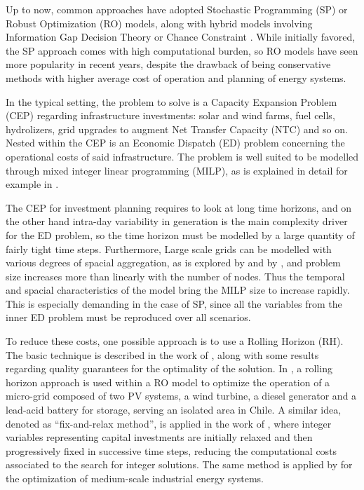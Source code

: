 \documentclass[smallextended,natbib]{svjour3}       %
\numberwithin{theorem}{section}
\begin{document}
Up to now, common approaches have adopted Stochastic Programming (SP) or Robust Optimization (RO) models, along with hybrid
 models involving Information Gap Decision Theory or Chance Constraint \citep{review_math_opt}. 
While initially favored, the SP approach comes with high computational burden, so RO models have seen more popularity 
in recent years, despite the drawback of being conservative methods with higher average cost of operation and planning of energy systems.

In the typical setting, the problem to solve is a Capacity Expansion Problem (CEP) regarding infrastructure investments:
 solar and wind farms, fuel cells, hydrolizers, grid upgrades to augment Net Transfer Capacity (NTC) and so on. 
Nested within the CEP is an Economic Dispatch (ED) problem concerning the operational costs of said infrastructure. 
The problem is well suited to be modelled through mixed integer linear programming (MILP), as is explained in detail for example in 
\citet{INTRO_isolated_MIP}.%

The CEP for investment planning requires to look at long time horizons, and on the other hand intra-day variability in generation is the main complexity driver for the ED problem, so the time horizon must be modelled by a large quantity of fairly tight time steps. 
Furthermore, Large scale grids can be modelled with various degrees of spacial aggregation, as is explored by \citet{Horsch} and by \citet{BIENER2020106349}, and problem size increases more than linearly with the number of nodes.
Thus the temporal and spacial characteristics of the model bring the MILP size to increase rapidly. 
This is especially demanding in the case of SP, since all the variables from the inner ED problem must be reproduced over all scenarios.

To reduce these costs, one possible approach is to use a Rolling Horizon (RH). 
The basic technique is described in the work of \citet{INTRO_Glomb}, along with some results regarding quality guarantees for the optimality of the solution. 
In \citet{INTRO_Palma-Behnke}, a rolling horizon approach is used within a RO model to optimize the operation of a micro-grid composed of two PV systems, a wind turbine, a diesel generator and a lead-acid battery for storage, serving an isolated area in Chile. 
A similar idea, denoted as ``fix-and-relax method'', is applied in the work of \citet{INTRO_karlsruhe}, 
where integer variables representing capital investments are initially relaxed 
and then progressively fixed in successive time steps, reducing the computational
 costs associated to the search for integer solutions. The same method is applied by \citet{papero_bin} for the optimization of medium-scale industrial energy systems.
\end{document}
